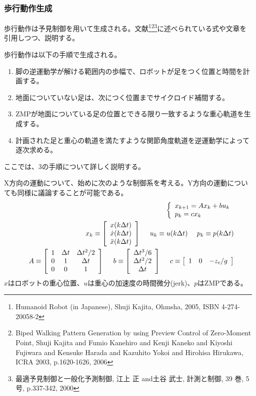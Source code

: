 \subsubsection{歩行動作生成}
歩行動作は予見制御を用いて生成される。文献\footnote{
Humanoid Robot (in Japanese), Shuji Kajita, Ohmsha, 2005, ISBN 4-274-20058-2
}\footnote{
Biped Walking Pattern Generation by using Preview Control of Zero-Moment Point, Shuji Kajita and Fumio Kanehiro and Kenji Kaneko and Kiyoshi Fujiwara and Kensuke Harada and Kazuhito Yokoi and Hirohisa Hirukawa, ICRA 2003, p.1620-1626, 2006
}\footnote{
最適予見制御と一般化予測制御, 江上 正 and土谷 武士, 計測と制御, 39 巻, 5 号, p.337-342, 2000
}に述べられている式や文章を引用しつつ、説明する。

歩行動作は以下の手順で生成される。
\begin{enumerate}
\item 脚の逆運動学が解ける範囲内の歩幅で、ロボットが足をつく位置と時間を計画する。
\item 地面についていない足は、次につく位置までサイクロイド補間する。
\item ZMPが地面についている足の位置とできる限り一致するような重心軌道を生成する。
\item 計画された足と重心の軌道を満たすような関節角度軌道を逆運動学によって逐次求める。
\end{enumerate}
ここでは、3の手順について詳しく説明する。

X方向の運動について、始めに次のような制御系を考える。Y方向の運動についても同様に議論することが可能である。
\begin{eqnarray}
  && \left\{
  \begin{array}{l}
    x_{k+1} = A x_k + b u_k \\
    p_k = c x_k
  \end{array}
  \right. \eqlabel{preview_control}\\
  && x_k \equiv \left[
    \begin{array}{c}
      x(k\Delta t)\\
      \dot x(k\Delta t)\\
      \ddot x(k\Delta t)
    \end{array}
    \right] ~~~~ u_k \equiv u(k\Delta t) ~~~~ p_k \equiv p(k\Delta t)\nonumber\\
  && A \equiv \left[
    \begin{array}{c c c}
      1 & \Delta t & \Delta t^2 / 2\\
      0 & 1 & \Delta t\\
      0 & 0 & 1
    \end{array}
    \right] ~~~~ b \equiv \left[
    \begin{array}{c}
      \Delta t^3 / 6\\
      \Delta t^2 / 2\\
      \Delta t
    \end{array}
    \right] ~~~~ c \equiv \left[
    \begin{array}{c c c}
      1 & 0 & -z_c/g
    \end{array}
    \right]\nonumber
\end{eqnarray}
$x$はロボットの重心位置、$u$は重心の加速度の時間微分(jerk)、$p$はZMPである。

